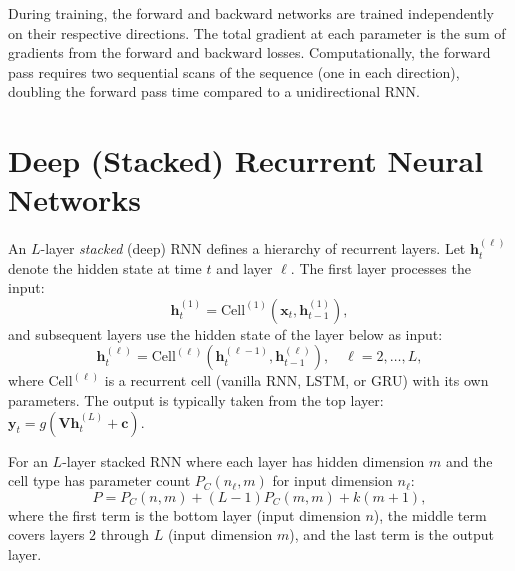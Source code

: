 \documentclass[11pt,a4paper]{article}
\begin{document}
\begin{remark}
\label{rem:bidir-training}
During training, the forward and backward networks are trained
independently on their respective directions.  The total gradient
at each parameter is the sum of gradients from the forward and
backward losses.  Computationally, the forward pass requires
two sequential scans of the sequence (one in each direction),
doubling the forward pass time compared to a unidirectional RNN.
\end{remark}

\section{Deep (Stacked) Recurrent Neural Networks}
\label{sec:deep-rnn}

\begin{definition}
\label{def:stacked}
An $L$-layer \emph{stacked} (deep) RNN defines a hierarchy of
recurrent layers.  Let $\mathbf{h}_t^{(\ell)}$ denote the hidden
state at time $t$ and layer $\ell$.  The first layer processes the
input:
\begin{equation}
  \mathbf{h}_t^{(1)} = \text{Cell}^{(1)}(\mathbf{x}_t,
    \mathbf{h}_{t-1}^{(1)}),
  \label{eq:stacked-layer1}
\end{equation}
and subsequent layers use the hidden state of the layer below as
input:
\begin{equation}
  \mathbf{h}_t^{(\ell)} = \text{Cell}^{(\ell)}(
    \mathbf{h}_t^{(\ell-1)}, \mathbf{h}_{t-1}^{(\ell)}),
    \quad \ell = 2, \ldots, L,
  \label{eq:stacked-layerL}
\end{equation}
where $\text{Cell}^{(\ell)}$ is a recurrent cell (vanilla RNN,
LSTM, or GRU) with its own parameters.  The output is typically
taken from the top layer: $\mathbf{y}_t = g(\mathbf{V}
\mathbf{h}_t^{(L)} + \mathbf{c})$.
\end{definition}

\begin{proposition}
\label{prop:stacked-params}
For an $L$-layer stacked RNN where each layer has hidden dimension
$m$ and the cell type has parameter count $P_C(n_\ell, m)$ for
input dimension $n_\ell$:
\begin{equation}
  P = P_C(n, m) + (L - 1) P_C(m, m) + k(m + 1),
  \label{eq:stacked-params}
\end{equation}
where the first term is the bottom layer (input dimension $n$), the
middle term covers layers $2$ through $L$ (input dimension $m$), and
the last term is the output layer.
\end{proposition}
\end{document}
